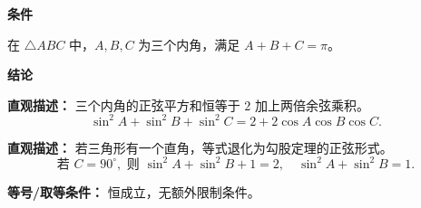 \begin{statementbox}
\textbf{\textcolor{CStatement}{条件}}

\begin{description}[style=nextline, leftmargin=2.8em, labelsep=0.5em, itemsep=0.35em]
    \item[\textbf{\textcolor{CStatement}{条件 1（三角形内角）：}}] 在 $\triangle ABC$ 中，$A,B,C$ 为三个内角，满足 $A+B+C=\pi$。
\end{description}

\textbf{\textcolor{CStatement}{结论}}

\begin{description}[style=nextline, leftmargin=2.8em, labelsep=0.5em, itemsep=0.45em]
    \item[\textbf{\textcolor{CStatement}{结论一（恒等关系）：}}]
    \textbf{\textcolor{CStatement}{直观描述：}} 三个内角的正弦平方和恒等于 $2$ 加上两倍余弦乘积。
    \[
    \sin^2 A+\sin^2 B+\sin^2 C = 2+2\cos A\cos B\cos C.
    \]

    \item[\textbf{\textcolor{CStatement}{推广结论（直角情形）：}}]
    \textbf{\textcolor{CStatement}{直观描述：}} 若三角形有一个直角，等式退化为勾股定理的正弦形式。
    \[
    \text{若 }C=90^\circ,\text{ 则 }\sin^2 A+\sin^2 B+1=2,\quad \sin^2 A+\sin^2 B=1.
    \]
\end{description}

\textbf{\textcolor{CStatement}{等号/取等条件：}} 恒成立，无额外限制条件。
\end{statementbox}

